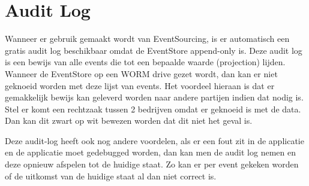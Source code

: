 
\section{Audit Log}
\label{sec:audit-log}

Wanneer er gebruik gemaakt wordt van EventSourcing, is er automatisch een gratis audit log beschikbaar omdat de EventStore append-only is. Deze audit log is een bewijs van alle events die tot een bepaalde waarde (projection) lijden. Wanneer de EventStore op een \gls{WORM} drive gezet wordt, dan kan er niet geknoeid worden met deze lijst van events. Het voordeel hieraan is dat er gemakkelijk bewijs kan geleverd worden naar andere partijen indien dat nodig is. Stel er komt een rechtzaak tussen 2 bedrijven omdat er geknoeid is met de data. Dan kan dit zwart op wit bewezen worden dat dit niet het geval is.

Deze audit-log heeft ook nog andere voordelen, als er een fout zit in de applicatie en de applicatie moet gedebugged worden, dan kan men de audit log nemen en deze opnieuw afspelen tot de huidige staat. Zo kan er per event gekeken worden of de uitkomst van de huidige staat al dan niet correct is.